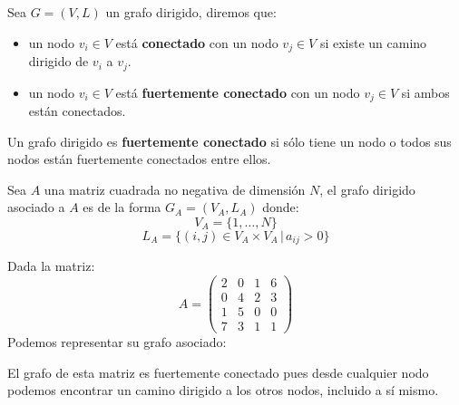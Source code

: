 \begin{definition}
    Sea $G=(V,L)$ un grafo dirigido, diremos que:
    \begin{itemize}
        \item un nodo $v_i\in V$ está \textbf{conectado} con un nodo $v_j\in V$ si existe un camino dirigido de $v_i$ a $v_j$.
        \item un nodo $v_i\in V$ está \textbf{fuertemente conectado} con un nodo $v_j\in V$ si ambos están conectados.
    \end{itemize}
    Un grafo dirigido es \textbf{fuertemente conectado} si sólo tiene un nodo o todos sus nodos están fuertemente conectados entre ellos.
\end{definition}

\begin{definition}
    Sea $A$ una matriz cuadrada no negativa de dimensión $N$, el grafo dirigido asociado a $A$ es de la forma $G_A=(V_A,L_A)$ donde:
    \[V_A=\{1,\dots,N\}\] 
    \[L_A=\{(i,j)\in V_A\times V_A \,|\, a_{ij}>0\}\]
\end{definition}

\begin{exampleth}
    Dada la matriz:
    \[A=\begin{pmatrix}
        2 & 0 & 1 & 6 \\
        0 & 4 & 2 & 3 \\
        1 & 5 & 0 & 0 \\
        7 & 3 & 1 & 1 
    \end{pmatrix}\]
    Podemos representar su grafo asociado:
    \begin{center}
    \end{center}
    El grafo de esta matriz es fuertemente conectado pues desde cualquier nodo podemos encontrar un camino dirigido a los otros nodos, incluido a sí mismo.
\end{exampleth}